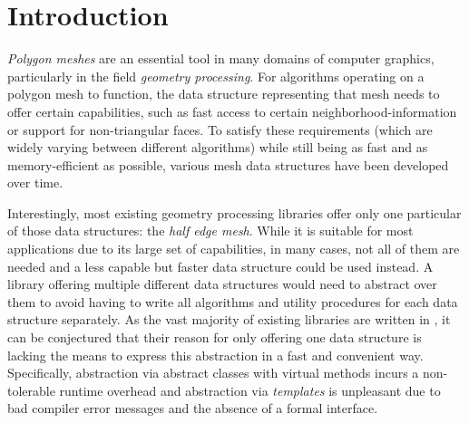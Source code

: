 \chapter{Introduction}



\emph{Polygon meshes} are an essential tool in many domains of computer graphics, particularly in the field \emph{geometry processing}.
For algorithms operating on a polygon mesh to function, the data structure representing that mesh needs to offer certain capabilities, such as fast access to certain neighborhood-information or support for non-triangular faces.
To satisfy these requirements (which are widely varying between different algorithms) while still being as fast and as memory-efficient as possible, various mesh data structures have been developed over time.

Interestingly, most existing geometry processing libraries offer only one particular of those data structures: the \emph{half edge mesh}.
While it is suitable for most applications due to its large set of capabilities, in many cases, not all of them are needed and a less capable but faster data structure could be used instead.
A library offering multiple different data structures would need to abstract over them to avoid having to write all algorithms and utility procedures for each data structure separately.
As the vast majority of existing libraries are written in \cpp, it can be conjectured that their reason for only offering one data structure is \cpp lacking the means to express this abstraction in a fast and convenient way.
Specifically, abstraction via abstract classes with virtual methods incurs a non-tolerable runtime overhead and abstraction via \emph{\cpp templates} is unpleasant due to bad compiler error messages and the absence of a formal interface.

